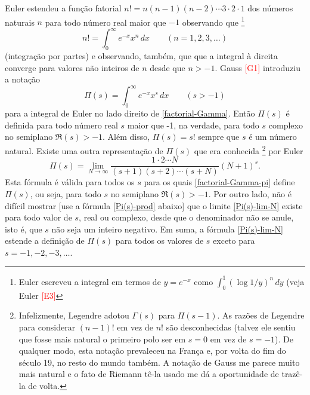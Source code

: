     
    Euler estendeu a função fatorial $n! = n(n-1)(n-2) \cdots 3 \cdot 2 \cdot 1$ dos números naturais $n$ para todo número real maior que $-1$ observando que 
    \footnote{Euler escreveu a integral em termos de $y = e^{-x}$ como $\int_{0}^{1}(\log 1/y)^n \, dy$ (veja Euler \textcolor{red}{[E3]}
    }
    \begin{equation}
        \label{factorial-Gamma}
        n! = \int_{0}^{\infty}e^{-x}x^n \, dx \qquad (n = 1, 2, 3, \dots)
    \end{equation}
    (integração por partes) e observando, também, que que a integral à direita converge para valores não inteiros de $n$ desde que $n>-1$. Gauss \textcolor{red}{[G1]} introduziu a notação
    \begin{equation}
        \label{factorial-Gamma-pi}
        \Pi(s) = \int_{0}^{\infty}e^{-x}x^s \, dx \qquad (s>-1)
    \end{equation}
    para a integral de Euler no lado direito de \eqref{factorial-Gamma}. Então $\Pi(s)$ é definida para todo número real $s$ maior que -1, na verdade, para todo $s$ complexo no semiplano $\Re(s)>-1$. Além disso, $\Pi(s) = s!$ sempre que $s$ é um número natural. Existe uma outra representação de $\Pi(s)$ que era conhecida
    \footnote{Infelizmente, Legendre adotou $\Gamma(s)$ para $\Pi(s-1)$. As razões de Legendre para considerar $(n-1)!$ em vez de $n!$ são desconhecidas (talvez ele sentiu que fosse mais natural o primeiro polo ser em $s=0$ em vez de $s=-1$). De qualquer modo, esta notação prevaleceu na França e, por volta do fim do século 19, no resto do mundo também. A notação de Gauss me parece muito mais natural e o fato de Riemann tê-la usado me dá a oportunidade de trazê-la de volta.
    }
    por Euler
    \begin{equation}
        \label{Pi(s)-lim-N}
        \Pi(s) = \lim_{N \to \infty} \frac{1 \cdot 2 \cdots N}{(s+1)(s+2)\cdots (s+N)}(N+1)^s.
    \end{equation}
    Esta fórmula é válida para todos os $s$ para os quais \eqref{factorial-Gamma-pi} define $\Pi(s)$, ou seja, para todo $s$ no semiplano $\Re(s)>-1$. Por outro lado, não é difícil mostrar [use a fórmula \eqref{Pi(s)-prod} abaixo] que o limite \eqref{Pi(s)-lim-N} existe para todo valor de $s$, real ou complexo, desde que o denominador não se anule, isto é, que $s$ não seja um inteiro negativo. Em suma, a fórmula \eqref{Pi(s)-lim-N} estende a definição de $\Pi(s)$ para todos os valores de $s$ exceto para $s = -1, -2, -3, \dots$.
    
